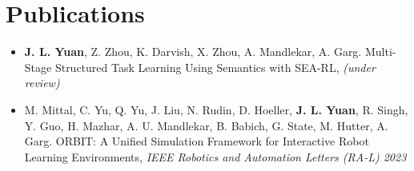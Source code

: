 \documentclass[letterpaper,11pt]{article}
\begin{document}
\section{Publications}
\begin{itemize}[leftmargin=0.15in, label={}]
    \item{
    \small{\textbf{J. L. Yuan}, Z. Zhou, K. Darvish, X. Zhou, A. Mandlekar, A. Garg. Multi-Stage Structured Task Learning Using
		Semantics with SEA-RL, \textit{(under review)}}
    }
 \end{itemize}\vspace{-15pt}
\begin{itemize}[leftmargin=0.15in, label={}]
    \item{
    \small{M. Mittal, C. Yu, Q. Yu, J. Liu, N. Rudin, D. Hoeller, \textbf{J. L. Yuan}, R. Singh, Y. Guo, H. Mazhar, A. U. Mandlekar, B. Babich, G. State, M. Hutter, A. Garg. ORBIT: A Unified Simulation Framework for Interactive Robot Learning Environments, \textit{IEEE Robotics and Automation Letters (RA-L) 2023}}
    }
 \end{itemize}\vspace{-15pt}
\end{document}
